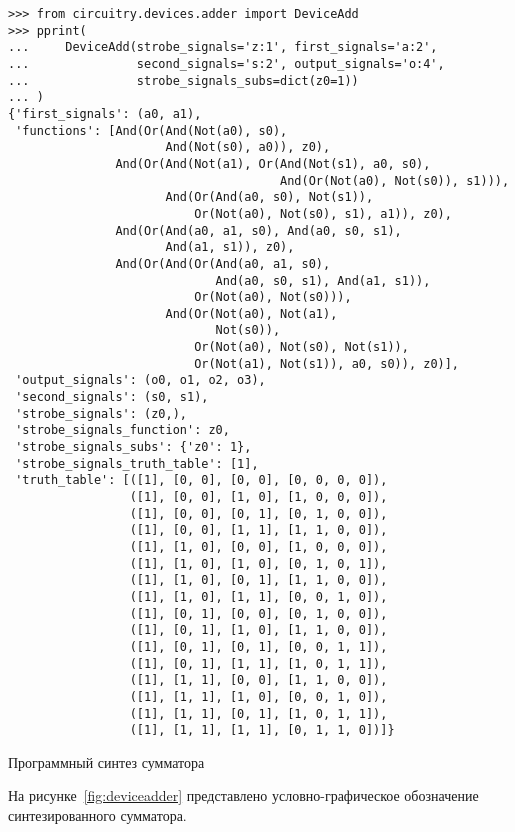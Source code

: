 \documentclass[document.tex]{subfiles}
\begin{document}
\begin{listing}[ht]
\begin{verbatim}
>>> from circuitry.devices.adder import DeviceAdd        
>>> pprint(                                                   
...     DeviceAdd(strobe_signals='z:1', first_signals='a:2',
...               second_signals='s:2', output_signals='o:4',
...               strobe_signals_subs=dict(z0=1))         
... )
{'first_signals': (a0, a1),
 'functions': [And(Or(And(Not(a0), s0), 
                      And(Not(s0), a0)), z0),
               And(Or(And(Not(a1), Or(And(Not(s1), a0, s0), 
                                      And(Or(Not(a0), Not(s0)), s1))), 
                      And(Or(And(a0, s0), Not(s1)), 
                          Or(Not(a0), Not(s0), s1), a1)), z0), 
               And(Or(And(a0, a1, s0), And(a0, s0, s1), 
                      And(a1, s1)), z0),
               And(Or(And(Or(And(a0, a1, s0), 
                             And(a0, s0, s1), And(a1, s1)), 
                          Or(Not(a0), Not(s0))), 
                      And(Or(Not(a0), Not(a1),
                             Not(s0)), 
                          Or(Not(a0), Not(s0), Not(s1)),
                          Or(Not(a1), Not(s1)), a0, s0)), z0)], 
 'output_signals': (o0, o1, o2, o3),
 'second_signals': (s0, s1),
 'strobe_signals': (z0,),
 'strobe_signals_function': z0,
 'strobe_signals_subs': {'z0': 1},
 'strobe_signals_truth_table': [1],
 'truth_table': [([1], [0, 0], [0, 0], [0, 0, 0, 0]),
                 ([1], [0, 0], [1, 0], [1, 0, 0, 0]),
                 ([1], [0, 0], [0, 1], [0, 1, 0, 0]),
                 ([1], [0, 0], [1, 1], [1, 1, 0, 0]),
                 ([1], [1, 0], [0, 0], [1, 0, 0, 0]),
                 ([1], [1, 0], [1, 0], [0, 1, 0, 1]),
                 ([1], [1, 0], [0, 1], [1, 1, 0, 0]),
                 ([1], [1, 0], [1, 1], [0, 0, 1, 0]),
                 ([1], [0, 1], [0, 0], [0, 1, 0, 0]),
                 ([1], [0, 1], [1, 0], [1, 1, 0, 0]),
                 ([1], [0, 1], [0, 1], [0, 0, 1, 1]),
                 ([1], [0, 1], [1, 1], [1, 0, 1, 1]),
                 ([1], [1, 1], [0, 0], [1, 1, 0, 0]),
                 ([1], [1, 1], [1, 0], [0, 0, 1, 0]),
                 ([1], [1, 1], [0, 1], [1, 0, 1, 1]),
                 ([1], [1, 1], [1, 1], [0, 1, 1, 0])]}
\end{verbatim}
\caption{Программный синтез сумматора}
\label{lst:addergen}
\end{listing}

\clearpage

На рисунке~\ref{fig:deviceadder} представлено условно-графическое обозначение
синтезированного сумматора.
\end{document}
